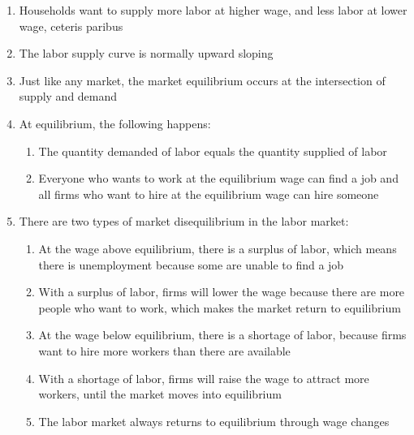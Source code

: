 \documentclass[12pt]{article}
\begin{document}
\begin{enumerate}
\begin{enumerate}
          \item Households want to supply more labor at higher wage, and less labor at lower wage, ceteris paribus

          \item The labor supply curve is normally upward sloping

          \item Just like any market, the market equilibrium occurs at the intersection of supply and demand

          \item At equilibrium, the following happens:

            \begin{enumerate}

              \item The quantity demanded of labor equals the quantity supplied of labor

              \item Everyone who wants to work at the equilibrium wage can find a job and all firms who want to hire at the equilibrium wage can hire someone

            \end{enumerate}

          \item There are two types of market disequilibrium in the labor market:

            \begin{enumerate}

              \item At the wage above equilibrium, there is a surplus of labor, which means there is unemployment because some are unable to find a job

              \item With a surplus of labor, firms will lower the wage because there are more people who want to work, which makes the market return to equilibrium

              \item At the wage below equilibrium, there is a shortage of labor, because firms want to hire more workers than there are available

              \item With a shortage of labor, firms will raise the wage to attract more workers, until the market moves into equilibrium

              \item The labor market always returns to equilibrium through wage changes


\end{enumerate}
\end{enumerate}
\end{enumerate}
\end{document}
